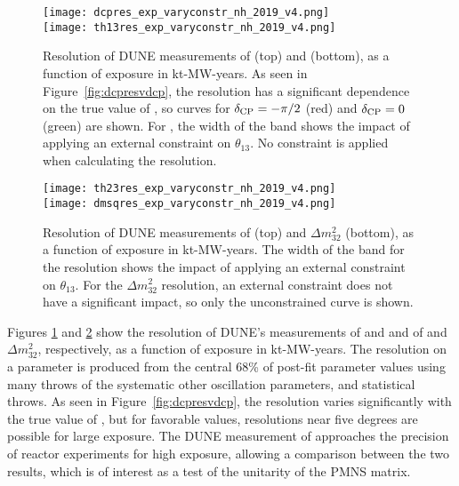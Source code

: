 \begin{figure}[htbp]
    \centering
    \texttt{[image: dcpres\_exp\_varyconstr\_nh\_2019\_v4.png]}\\
    \texttt{[image: th13res\_exp\_varyconstr\_nh\_2019\_v4.png]} 
    \caption[Resolution of DUNE measurements of \deltacp and , as a function of exposure]{Resolution of DUNE measurements of \deltacp (top) and  (bottom), as a function of exposure in kt-MW-years. As seen in Figure~\ref{fig:dcpresvdcp}, the \deltacp resolution has a significant dependence on the true value of \deltacp, so curves for $\delta_{\rm CP}=-\pi/2$ (red) and $\delta_{\rm CP}=0$ (green) are shown. For \deltacp, the width of the band shows the impact of applying an external constraint on $\theta_{13}$. No constraint is applied when calculating the  resolution.}
    \label{fig:appres_exp}
\end{figure}
\begin{figure}[htbp]
    \centering
    \texttt{[image: th23res\_exp\_varyconstr\_nh\_2019\_v4.png]}\\
    \texttt{[image: dmsqres\_exp\_varyconstr\_nh\_2019\_v4.png]} 
    \caption[Resolution of DUNE measurements of  (top) and $\Delta m^{2}_{32}$, as a function of exposure]{Resolution of DUNE measurements of  (top) and $\Delta m^{2}_{32}$ (bottom), as a function of exposure in kt-MW-years. The width of the band for the  resolution shows the impact of applying an external constraint on $\theta_{13}$. For the $\Delta m^{2}_{32}$ resolution, an external constraint does not have a significant impact, so only the unconstrained curve is shown.}
    \label{fig:disres_exp}
\end{figure}
Figures \ref{fig:appres_exp} and \ref{fig:disres_exp} show the resolution of DUNE's measurements of \deltacp and  and of  and $\Delta m^{2}_{32}$, respectively, as a function of exposure in kt-MW-years. The resolution on a parameter is produced from the central 68\% of post-fit parameter values using many throws of the systematic other oscillation parameters, and statistical throws. As seen in Figure~\ref{fig:dcpresvdcp}, the \deltacp resolution varies significantly with the true value of \deltacp, but for favorable values, resolutions near five degrees are possible for large exposure. The DUNE measurement of  approaches the precision of reactor experiments for high exposure, allowing a comparison between the two results, which is of interest as a test of the unitarity of the PMNS matrix. 


